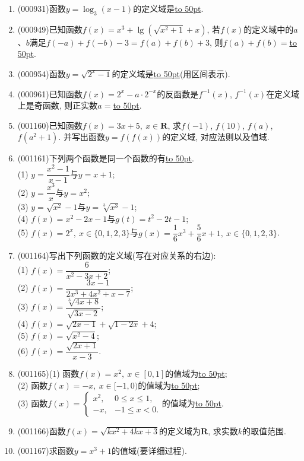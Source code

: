 \documentclass[10pt,a4paper]{article}
\newcommand{\blank}[1]{\underline{\hbox to #1pt{}}}
\begin{document}
\begin{enumerate}[1.]
\item {\tiny (000931)}函数$y=\log_3 (x-1)$的定义域是\blank{50}.
\item {\tiny (000949)}已知函数$f(x)={x^3}+\lg (\sqrt{x^2+1}+x)$, 若$f(x)$的定义域中的$a$、$b$满足$f(-a)+f(-b)-3=f(a)+f(b)+3$, 则$f(a)+f(b)=$\blank{50}.
\item {\tiny (000954)}函数$y=\sqrt{2^x-1}$的定义域是\blank{50}(用区间表示).
\item {\tiny (000961)}已知函数$f(x)=2^x-a\cdot 2^{-x}$的反函数是$f^{-1}(x)$, $f^{-1}(x)$在定义域上是奇函数, 则正实数$a=$\blank{50}.
\item {\tiny (001160)}已知函数$f(x)=3x+5, \ x\in \mathbf{R}$, 求$f(-1)$, $f(10)$, $f(a)$, $f(a^2+1)$. 并写出函数$y=f(f(x))$的定义域, 对应法则以及值域.
\item {\tiny (001161)}下列两个函数是同一个函数的有\blank{50}.\\ 
(1) $y=\dfrac{x^2-1}{x-1}$与$y=x+1$;\\ 
(2) $y=\dfrac{x^3}{x}$与$y=x^2$;\\ 
(3) $y=\sqrt{x^2}-1$与$y=\sqrt[3]{x^3}-1$;\\ 
(4) $f(x)=x^2-2x-1$与$g(t)=t^2-2t-1$;\\ 
(5) $f(x)=2^x, \ x \in \{0,1,2,3\}$与$g(x)=\dfrac16x^3+\dfrac56x+1, \ x \in \{0,1,2,3\}$.
\item {\tiny (001164)}写出下列函数的定义域(写在对应关系的右边):\\ 
(1) $f(x)=\dfrac{6}{x^2-3x+2}$;\\ 
(2) $f(x)=\dfrac{3x-1}{2x^3+4x^2+x-7}$;\\ 
(3) $f(x)=\dfrac{\sqrt[3]{4x+8}}{\sqrt{3x-2}}$;\\ 
(4) $f(x)=\sqrt{2x-1}+\sqrt{1-2x}+4$;\\ 
(5) $f(x)=\sqrt{x^2-4}$;\\ 
(6) $f(x)=\dfrac{\sqrt{2x+1}}{x-3}$.
\item {\tiny (001165)}(1) 函数$f(x)=x^2, \ x \in [0,1]$的值域为\blank{50};\\ 
(2) 函数$f(x)=-x, \ x \in [-1,0)$的值域为\blank{50};\\ 
(3) 函数$f(x)=\left\{\begin{array}{cc}x^2,&0\le x\le 1,\\-x,&-1\le x<0.\end{array}\right.$的值域为\blank{50}.
\item {\tiny (001166)}函数$f(x)=\sqrt{kx^2+4kx+3}$的定义域为$\mathbf{R}$, 求实数$k$的取值范围.
\item {\tiny (001167)}求函数$y=x^3+1$的值域(要详细过程).

\end{enumerate}
\end{document}
